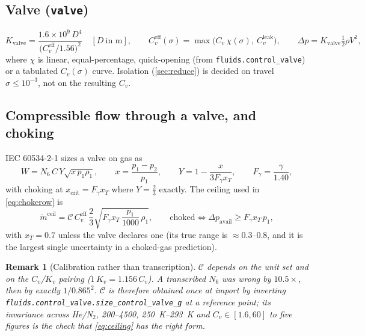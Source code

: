 \documentclass[11pt,a4paper]{article}
\newtheorem{remark}{Remark}
\newcommand{\mdot}{\dot{m}}
\newcommand{\code}[1]{\texttt{#1}}
\begin{document}
\subsection{Valve (\code{valve})}\label{sec:valve}
\begin{equation}
  K_{\mathrm{valve}} = \frac{1.6\times10^{9}\,D^{4}}{\bigl(C_v^{\mathrm{eff}}/1.56\bigr)^{2}}\quad[D\ \text{in m}],
  \qquad
  C_v^{\mathrm{eff}}(\sigma) = \max\bigl(C_v\,\chi(\sigma),\ C_v^{\mathrm{leak}}\bigr),
  \qquad
  \Delta p = K_{\mathrm{valve}}\tfrac12\rho V^2,
  \label{eq:cvk}
\end{equation}
where $\chi$ is linear, equal-percentage, quick-opening (from
\code{fluids.control\_valve}) or a tabulated $C_v(\sigma)$ curve. Isolation
(\cref{sec:reduce}) is decided on travel $\sigma\le10^{-3}$, not on the
resulting $C_v$.

\subsection{Compressible flow through a valve, and choking}\label{sec:choking}
IEC 60534-2-1 sizes a valve on gas as
\begin{equation}
  W = N_6\,C\,Y\sqrt{x\,p_1\rho_1},\qquad
  x=\frac{p_1-p_2}{p_1},\qquad
  Y=1-\frac{x}{3F_\gamma x_T},\qquad
  F_\gamma=\frac{\gamma}{1.40},
  \label{eq:iec}
\end{equation}
with choking at $x_{\mathrm{crit}}=F_\gamma x_T$ where $Y=\tfrac23$ exactly.
The ceiling used in \cref{eq:chokerow} is
\begin{equation}
  \mdot^{\mathrm{ceil}} = \mathcal{C}\,C_v^{\mathrm{eff}}\,\frac{2}{3}
     \sqrt{F_\gamma x_T\,\frac{p_1}{1000}\,\rho_1},
  \qquad
  \text{choked}\iff \Delta p_{\mathrm{avail}}\ge F_\gamma x_T\,p_1,
  \label{eq:ceiling}
\end{equation}
with $x_T=0.7$ unless the valve declares one (its true range is
$\approx0.3$--$0.8$, and it is the largest single uncertainty in a choked-gas
prediction).

\begin{remark}[Calibration rather than transcription]
$\mathcal{C}$ depends on the unit set and on the $C_v$/$K_v$ pairing
($1\,K_v = 1.156\,C_v$). A transcribed $N_6$ was wrong by $10.5\times$, then by
exactly $1/0.865^2$. $\mathcal{C}$ is therefore obtained once at import by
inverting \code{fluids.control\_valve.size\_control\_valve\_g} at a reference
point; its invariance across He/N$_2$, \SIrange{200}{4500}{\psi},
\SIrange{250}{293}{\kelvin} and $C_v\in[1.6,60]$ to five figures is the check
that \cref{eq:ceiling} has the right \emph{form}.
\end{remark}
\end{document}
